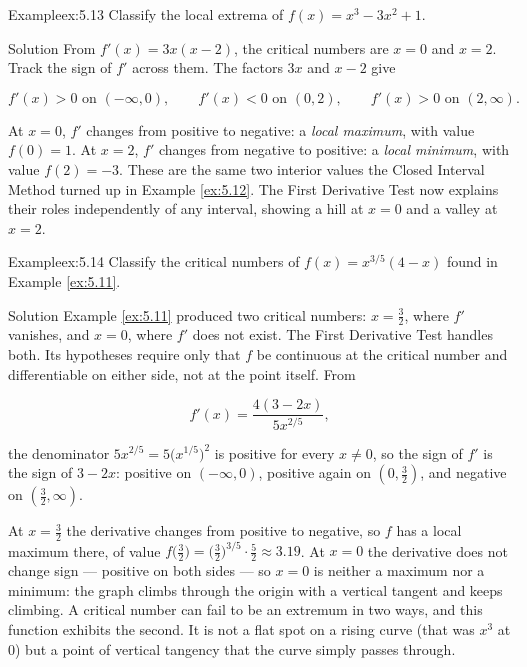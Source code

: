 \documentclass[a4paper,12pt,oneside]{memoir}
\begin{document}
\begin{workedexample}
\begin{envexample}{Example}{ex:5.13}{}
Classify the local extrema of \(f(x) = x^{3} - 3x^{2} + 1\).
\end{envexample}
\begin{envsolution}{Solution}{}{}
From \(f'(x) = 3x(x - 2)\), the critical numbers are \(x = 0\) and \(x = 2\). Track the sign of \(f'\) across them. The factors \(3x\) and \(x - 2\) give

\[ f'(x) > 0 \text{ on } (-\infty, 0), \qquad f'(x) < 0 \text{ on } (0, 2), \qquad f'(x) > 0 \text{ on } (2, \infty). \]

At \(x = 0\), \(f'\) changes from positive to negative: a \emph{local maximum}, with value \(f(0) = 1\). At \(x = 2\), \(f'\) changes from negative to positive: a \emph{local minimum}, with value \(f(2) = -3\). These are the same two interior values the Closed Interval Method turned up in Example \ref{ex:5.12}. The First Derivative Test now explains their roles independently of any interval, showing a hill at \(x = 0\) and a valley at \(x = 2\). \qedmark
\end{envsolution}
\end{workedexample}
\begin{workedexample}
\begin{envexample}{Example}{ex:5.14}{}
Classify the critical numbers of \(f(x) = x^{3/5}(4 - x)\) found in Example \ref{ex:5.11}.
\end{envexample}
\begin{envsolution}{Solution}{}{}
Example \ref{ex:5.11} produced two critical numbers: \(x = \tfrac{3}{2}\), where \(f'\) vanishes, and \(x = 0\), where \(f'\) does not exist. The First Derivative Test handles both. Its hypotheses require only that \(f\) be continuous at the critical number and differentiable on either side, not at the point itself. From

\[ f'(x) = \frac{4(3 - 2x)}{5x^{2/5}}, \]

the denominator \(5x^{2/5} = 5\bigl(x^{1/5}\bigr)^{2}\) is positive for every \(x \ne 0\), so the sign of \(f'\) is the sign of \(3 - 2x\): positive on \((-\infty, 0)\), positive again on \((0, \tfrac{3}{2})\), and negative on \((\tfrac{3}{2}, \infty)\).

At \(x = \tfrac{3}{2}\) the derivative changes from positive to negative, so \(f\) has a local maximum there, of value \(f\bigl(\tfrac{3}{2}\bigr) = \bigl(\tfrac{3}{2}\bigr)^{3/5} \cdot \tfrac{5}{2} \approx 3.19\). At \(x = 0\) the derivative does not change sign — positive on both sides — so \(x = 0\) is neither a maximum nor a minimum: the graph climbs through the origin with a vertical tangent and keeps climbing. A critical number can fail to be an extremum in two ways, and this function exhibits the second. It is not a flat spot on a rising curve (that was \(x^{3}\) at \(0\)) but a point of vertical tangency that the curve simply passes through. \qedmark
\end{envsolution}
\end{workedexample}
\end{document}
